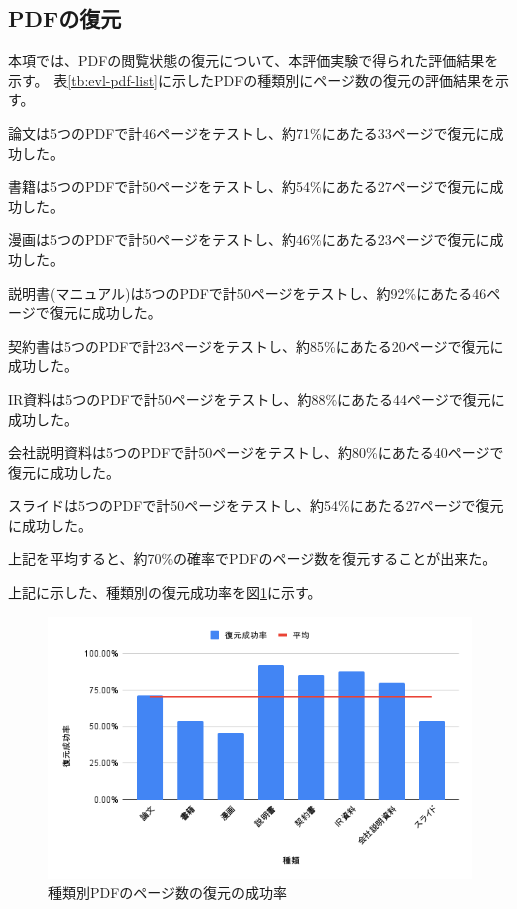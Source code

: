 \subsection{PDFの復元}
本項では、PDFの閲覧状態の復元について、本評価実験で得られた評価結果を示す。
表\ref{tb:evl-pdf-list}に示したPDFの種類別にページ数の復元の評価結果を示す。

論文は5つのPDFで計46ページをテストし、約71\%にあたる33ページで復元に成功した。

書籍は5つのPDFで計50ページをテストし、約54\%にあたる27ページで復元に成功した。

漫画は5つのPDFで計50ページをテストし、約46\%にあたる23ページで復元に成功した。

説明書(マニュアル)は5つのPDFで計50ページをテストし、約92\%にあたる46ページで復元に成功した。

契約書は5つのPDFで計23ページをテストし、約85\%にあたる20ページで復元に成功した。

IR資料は5つのPDFで計50ページをテストし、約88\%にあたる44ページで復元に成功した。

会社説明資料は5つのPDFで計50ページをテストし、約80\%にあたる40ページで復元に成功した。

スライドは5つのPDFで計50ページをテストし、約54\%にあたる27ページで復元に成功した。

上記を平均すると、約70\%の確率でPDFのページ数を復元することが出来た。

上記に示した、種類別の復元成功率を図\ref{fig:success-rate-pdf}に示す。


\begin{figure}[htbp]
  \caption{種類別PDFのページ数の復元の成功率}
  \label{fig:success-rate-pdf}
  \begin{center}
    \includegraphics[bb=0 0 600 371,width=15cm]{img/060_evaluation/result/pdf/success-rate-pdf.pdf}
  \end{center}
\end{figure}
